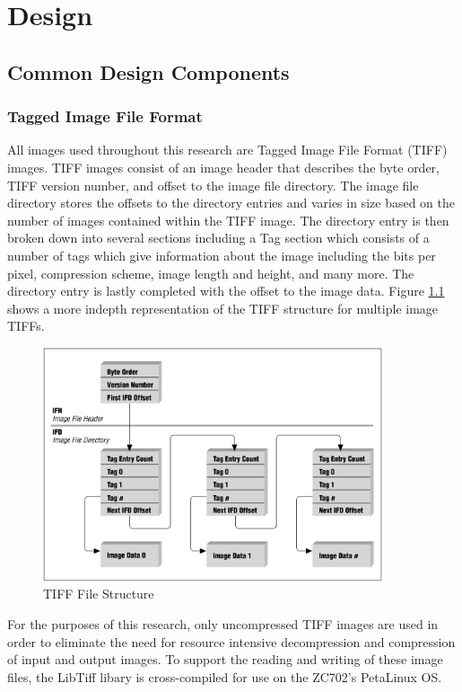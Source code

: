 
\chapter{Design}

\section{Common Design Components}

\subsection{Tagged Image File Format}
All images used throughout this research are Tagged Image File Format (TIFF) images. TIFF images consist of an image header that describes the byte order, TIFF version number, and offset to the image file directory\cite{Wiggins2001}.  The image file directory stores the offsets to the directory entries and varies in size based on the number of images contained within the TIFF image.  The directory entry is then broken down into several sections including a Tag section which consists of a number of tags which give information about the image including the bits per pixel, compression scheme, image length and height, and many more.  The directory entry is lastly completed with the offset to the image data. Figure \ref{fig:tiffFormat} shows a more indepth representation of the TIFF structure for multiple image TIFFs.

\begin{figure}
  \centering
  \includegraphics[width=10cm]{./img/tiffFormat.png}
  \caption{TIFF File Structure\cite{Murray1996}}
  \label{fig:tiffFormat}
\end{figure}

For the purposes of this research, only uncompressed TIFF images are used in order to eliminate the need for resource intensive decompression and compression of input and output images.  To support the reading and writing of these image files, the LibTiff libary is cross-compiled for use on the ZC702's PetaLinux OS. 
